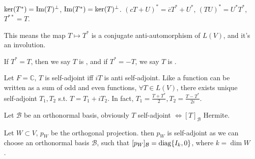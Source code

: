 \begin{proposition}
	$\ker(T^*) = \operatorname{Im}(T)^\perp$, $\operatorname{Im}(T^*) = \ker(T)^\perp$.
	$(cT+U)^* = \overline{c}T^* + U^*$, $(TU)^* = U^*T^*$, $T^{**} = T$.

	This means the map $T\mapsto T^*$ is a conjugate anti-automorphism of $L(V)$,
	and it's an involution.
\end{proposition}

If $T^* = T$, then we say $T$ is ,
and if $T^* = -T$, we say $T$ is .

Let $F = \mathbb{C}$, $T$ is self-adjoint iff $iT$ is anti self-adjoint.
Like a function can be written as a sum of odd and even functions,
$\forall T\in L(V)$, there exists unique self-adjoint $T_1, T_2$
s.t. $T = T_1 + iT_2$. In fact, $T_1 = \frac{T+T^*}{2}, T_2 = \frac{T-T^*}{2i}$.

Let $\mathcal{B}$ be an orthonormal basis,
obviously $T$ self-adjoint $\iff [T]_{\mathcal{B}}$ Hermite.

\begin{example}
    Let $W \subset V$, $p_W$ be the orthogonal projection.
	then $p_W$ is self-adjoint as we can choose an orthonormal basis $\mathcal{B}$,
	such that $[p_W]_{\mathcal{B}} = \operatorname{diag}\{I_k, 0\}$, where $k=\dim W$.
\end{example}

